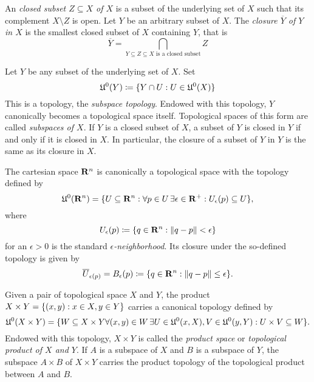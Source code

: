 An \emph{closed subset $Z \subseteq X$ of $X$} is a subset of the underlying
set of $X$ such that its complement $X \setminus Z$ is open. Let $Y$ be an
arbitrary subset of $X$. The \emph{closure $\overline Y$ of $Y$ in $X$} is the
smallest closed subset of $X$ containing $Y$, that is
\begin{equation}
  \overline Y = \bigcap_{\text{$Y \subseteq Z \subseteq X$ is a closed subset}} Z
\end{equation}

Let $Y$ be any subset of the underlying set of $X$. Set
\[
  \mathfrak U^0(Y) \coloneqq \lbrace Y \cap U: U \in \mathfrak U^0(X)\rbrace
\]
This is a topology, the \emph{subspace topology}. Endowed with this topology,
$Y$ canonically becomes a topological space itself. Topological spaces of this form
are called \emph{subspaces of $X$}. If $Y$ is a closed subset of $X$, a subset of
$Y$ is closed in $Y$ if and only if it is closed in $X$. In particular, the closure
of a subset of $Y$ in $Y$ is the same as its closure in $X$.

The cartesian space $\mathbf{R}^n$ is canonically a topological space with the
topology defined by
\begin{equation}
  \label{eq:cartesian_topology}
  \mathfrak U^0(\mathbf{R}^n) = \lbrace U \subseteq \mathbf{R}^n : \forall p \in U \,
  \exists \epsilon \in \mathbf{R}^+: U_\epsilon(p) \subseteq U\rbrace,
\end{equation}
where
\[
  U_\epsilon(p) \coloneqq \lbrace q \in \mathbf{R}^n : \lVert q - p\rVert < \epsilon\rbrace
\]
for an $\epsilon > 0$ is the standard \emph{$\epsilon$-neighborhood}. Its 
closure under the so-defined topology is given by
\[
  \overline U_{\epsilon(p)} = B_\epsilon(p) \coloneqq
  \lbrace q \in \mathbf{R}^n : \lVert q - p\rVert \leq \epsilon\rbrace.
\]

Given a pair of topological space $X$ and $Y$, the product
$X \times Y = \lbrace(x, y) : x \in X, y \in Y\rbrace$ carries a canonical topology
defined by
\begin{equation}
  \label{eq:product_topology}
  \mathfrak U^0(X \times Y) = \lbrace W \subseteq X \times Y \forall (x, y) \in W \,
  \exists U \in \mathfrak U^0(x, X), V \in \mathfrak U^0(y, Y):
  U \times V \subseteq W\rbrace.
\end{equation}
Endowed with this topology, $X \times Y$ is called the \emph{product space} or
\emph{topological product of $X$ and $Y$}. If $A$ is a subspace of $X$ and
$B$ is a subspace of $Y$, the subspace $A \times B$ of $X \times Y$ carries the
product topology of the topological product between $A$ and $B$.

